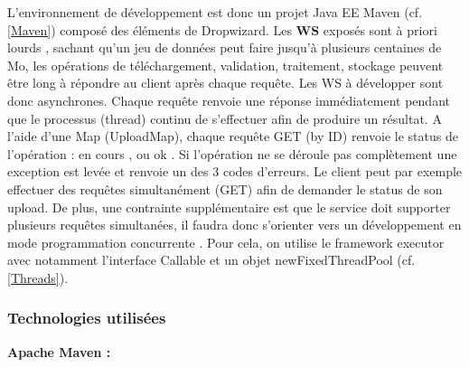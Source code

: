 \begin{itemize}
L'environnement de développement est donc un projet Java EE Maven (cf. \ref{Maven}) composé des éléments de Dropwizard. 
Les \textbf{WS} exposés sont à priori \og lourds \fg, sachant qu'un jeu de données peut faire jusqu'à plusieurs centaines de Mo, les opérations de téléchargement, validation, traitement, stockage peuvent être long à répondre au client après chaque requête. Les WS à développer sont donc asynchrones. 
Chaque requête renvoie une réponse \og immédiatement \fg pendant que le processus (thread) continu de s'effectuer afin de produire un résultat. A l'aide d'une Map (UploadMap), chaque requête GET (by ID) renvoie le status de l'opération : \og en cours \fg, ou \og ok \fg. Si l'opération ne se déroule pas complètement une exception est levée et renvoie un des 3 codes d'erreurs. Le client peut par exemple effectuer des requêtes simultanément (GET) afin de demander le status de son upload. De plus, une contrainte supplémentaire est que le service doit supporter plusieurs requêtes simultanées, il faudra donc s'orienter vers un développement en mode \og programmation concurrente \fg. Pour cela, on utilise le framework \og executor \fg avec notamment l'interface \og Callable \fg et un objet \og newFixedThreadPool \fg (cf. \ref{Threads}). \\

\pagebreak

\subsubsection{Technologies utilisées}\label{MobiSAASTechno}

\textbf{Apache Maven : } \label{Maven}


\end{itemize}
